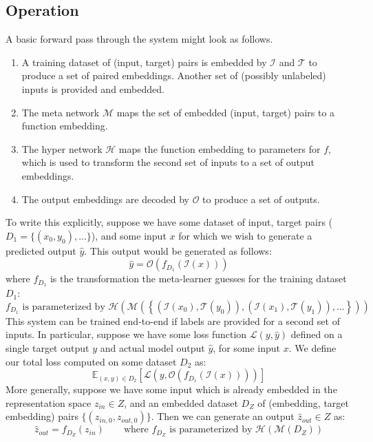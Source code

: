 \documentclass{article}
\begin{document}
\subsection{Operation}
A basic forward pass through the system might look as follows.
\begin{enumerate}
\item A training dataset of (input, target) pairs is embedded by $\mathcal{I}$ and $\mathcal{T}$ to produce a set of paired embeddings. Another set of (possibly unlabeled) inputs is provided and embedded.
\item The meta network $\mathcal{M}$ maps the set of embedded (input, target) pairs to a function embedding.
\item The hyper network $\mathcal{H}$ maps the function embedding to parameters for $f$, which is used to transform the second set of inputs to a set of output embeddings.
\item The output embeddings are decoded by $\mathcal{O}$ to produce a set of outputs.
\end{enumerate}
To write this explicitly, suppose we have some dataset of input, target pairs ($D_1 = \{(x_0, y_0), ...\}$), and some input $x$ for which we wish to generate a predicted output $\hat{y}$. This output would be generated as follows: 
\[\hat{y} = \mathcal{O}\left(f_{D_1}\left(\mathcal{I} \left(x\right)\right) \right)\]
where $f_{D_1}$ is the transformation the meta-learner guesses for the training dataset $D_1$:
\[f_{D_1} \text{ is parameterized by } \mathcal{H}\left(\mathcal{M}\left( \left\{\left(\mathcal{I}\left(x_0\right), \mathcal{T}\left(y_0\right) \right), \left(\mathcal{I}\left(x_1\right), \mathcal{T}\left(y_1\right) \right), ... \right\}\right)\right)\]
This system can be trained end-to-end if labels are provided for a second set of inputs. In particular, suppose we have some loss function $\mathcal{L}(y, \hat{y})$ defined on a single target output $y$ and actual model output $\hat{y}$, for some input $x$. We define our total loss computed on some dataset $D_2$ as:
\[\mathbb{E}_{(x, y)\in {D}_2} \left[ \mathcal{L}\left(y, \mathcal{O}\left(f_{D_1}\left(\mathcal{I} \left(x\right)\right) \right)\right)\right]\]
More generally, suppose we have some input which is already embedded in the representation space $z_{in} \in Z$, and an embedded dataset $D_Z$ of (embedding, target embedding) pairs $\{(z_{in,0}, z_{out,0})\}$. Then we can generate an output $\hat{z}_{out} \in Z$ as:  
\[\hat{z}_{out} = f_{D_Z}(z_{in}) \qquad \text{where } f_{D_Z} \text{ is parameterized by } \mathcal{H}\left(\mathcal{M}\left(D_Z\right)\right)\]
\end{document}

